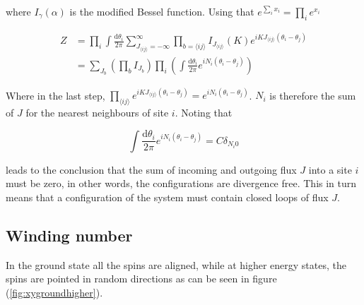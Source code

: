 where $I_\gamma(\alpha)$ is the modified Bessel function. Using that $e^{\sum_i x_i} = \prod_i e^{x_i}$

\begin{align}
    Z &= \prod_i \int \frac{\mathrm d \theta_i}{2 \pi} \sum_{J_{\langle ij \rangle} = -\infty}^{\infty} \prod_{b = \langle ij \rangle} I_{J_{\langle ij \rangle}} ( K ) e^{iK J_{\langle ij \rangle} (\theta_i - \theta_j)} \\
\label{eq:xypart2}
% 
    &= \sum_{J_b} \left ( \prod_b I_{J_b} \right ) \prod_i \left ( \int \frac{\mathrm d \theta_i}{2 \pi} e^{i N_i (\theta_i - \theta_j)} \right )
\end{align}

Where in the last step, $\prod_{\langle ij \rangle} e^{iKJ_{\langle ij \rangle} (\theta_i - \theta_j)} = e^{iN_i (\theta_i - \theta_j)}$. $N_i$ is therefore the sum of $J$ for the nearest neighbours of site $i$. Noting that

\begin{equation}
    \int \frac{\mathrm d \theta_i}{2 \pi} e^{i N_i (\theta_i - \theta_j)} = C \delta_{N_i 0}
\end{equation}

leads to the conclusion that the sum of incoming and outgoing flux $J$ into a site $i$ must be zero, in other words, the configurations are divergence free. This in turn means that a configuration of the system must contain closed loops of flux $J$.


\subsection{Winding number}
\label{subsec:XYWindingNum}

In the ground state all the spins are aligned, while at higher energy states, the spins are pointed in random directions as can be seen in figure (\ref{fig:xygroundhigher}).


